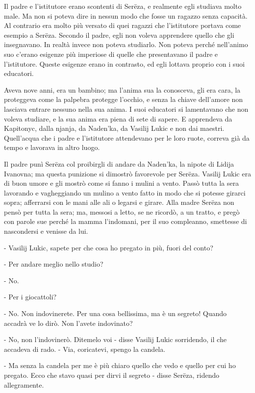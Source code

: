 Il padre e l'istitutore erano scontenti di Serëza, e realmente egli studiava molto male. Ma non si poteva dire in nessun modo che fosse un ragazzo senza capacità. Al contrario era molto più versato di quei ragazzi che l'istitutore portava come esempio a Serëza. Secondo il padre, egli non voleva apprendere quello che gli insegnavano. In realtà invece non poteva studiarlo. Non poteva perché nell'animo suo c'erano esigenze più imperiose di quelle che presentavano il padre e l'istitutore. Queste esigenze erano in contrasto, ed egli lottava proprio con i suoi educatori. 

Aveva nove anni, era un bambino; ma l'anima sua la conosceva, gli era cara, la proteggeva come la palpebra protegge l'occhio, e senza la chiave dell'amore non lasciava entrare nessuno nella sua anima. I suoi educatori si lamentavano che non voleva studiare, e la sua anima era piena di sete di sapere. E apprendeva da Kapitonyc, dalla njanja, da Naden'ka, da Vasilij Lukic e non dai maestri. Quell'acqua che i padre e l'istitutore attendevano per le loro ruote, correva già da tempo e lavorava in altro luogo. 

Il padre punì Serëza col proibirgli di andare da Naden'ka, la nipote di Lidija Ivanovna; ma questa punizione si dimostrò favorevole per Serëza. Vasilij Lukic era di buon umore e gli mostrò come si fanno i mulini a vento. Passò tutta la sera lavorando e vagheggiando un mulino a vento fatto in modo che si potesse girarci sopra; afferrarsi con le mani alle ali o legarsi e girare. Alla madre Serëza non pensò per tutta la sera; ma, messosi a letto, se ne ricordò, a un tratto, e pregò con parole sue perché la mamma l'indomani, per il suo compleanno, smettesse di nascondersi e venisse da lui. 

- Vasilij Lukic, sapete per che cosa ho pregato in più, fuori del conto? 

- Per andare meglio nello studio? 

- No. 

- Per i giocattoli? 

- No. Non indovinerete. Per una cosa bellissima, ma è un segreto! Quando accadrà ve lo dirò. Non l'avete indovinato? 

- No, non l'indovinerò. Ditemelo voi - disse Vasilij Lukic sorridendo, il che accadeva di rado. - Via, coricatevi, spengo la candela. 

- Ma senza la candela per me è più chiaro quello che vedo e quello per cui ho pregato. Ecco che stavo quasi per dirvi il segreto - disse Serëza, ridendo allegramente. 

